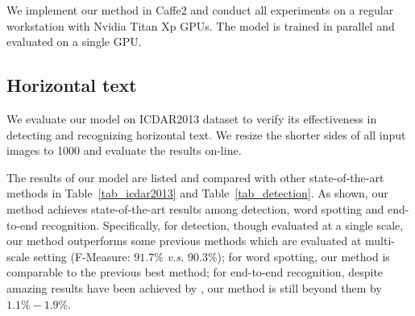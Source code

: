 \documentclass[runningheads]{llncs}
\begin{document}
We implement our method in Caffe2 and conduct all experiments on a regular workstation with Nvidia Titan Xp GPUs. The model is trained in parallel and evaluated on a single GPU.

\subsection{Horizontal text}
We evaluate our model on ICDAR2013 dataset to verify its effectiveness in detecting and recognizing horizontal text. We resize the shorter sides of all input images to 1000 and evaluate the results on-line.

The results of our model are listed and compared with other state-of-the-art methods in Table~\ref{tab_icdar2013} and Table~\ref{tab_detection}. As shown, our method achieves state-of-the-art results among detection, word spotting and end-to-end recognition. Specifically, for detection, though evaluated at a single scale, our method outperforms some previous methods which are evaluated at multi-scale setting \cite{hu2017wordsup,he2017deep} (F-Measure: $91.7\%$  \emph{v.s.}  $90.3\%$); for word spotting, our method is  comparable to the previous best method; for end-to-end recognition,  despite  amazing results have been achieved by \cite{liao2017textboxes,Li_2017_ICCV}, our method is still beyond them by $1.1\%-1.9\%$.
\end{document}

